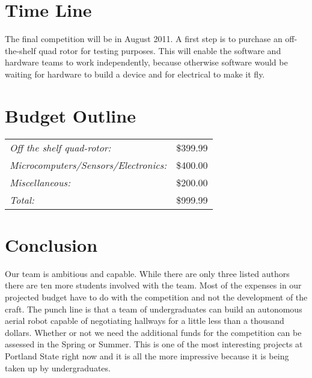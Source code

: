 \documentclass{article}
\begin{document}
\section{Time Line}

The final competition will be in August 2011. A first step is to purchase an off-the-shelf quad rotor for testing purposes. This will enable the software and hardware teams to work independently, because otherwise software would be waiting for hardware to build a device and for electrical to make it fly. 
\section{Budget Outline}

\begin{tabular}[t]{lr}
\it Off the shelf quad-rotor:           &\$399.99\\
\it Microcomputers/Sensors/Electronics: &\$400.00\\
\it Miscellaneous:                       &\$200.00\\\hline
\it Total:                              &\$999.99\\
\end{tabular}

\section{Conclusion}

Our team is ambitious and capable. While there are only three listed authors there are ten more students involved with the team. Most of the expenses in our projected budget have to do with the competition and not the development of the craft. The punch line is that a team of undergraduates can build an autonomous aerial robot capable of negotiating hallways for a little less than a thousand dollars. Whether or not we need the additional funds for the competition can be assessed in the Spring or Summer. This is one of the most interesting projects at Portland State right now and it is all the more impressive because it is being taken up by undergraduates. 
\end{document}
